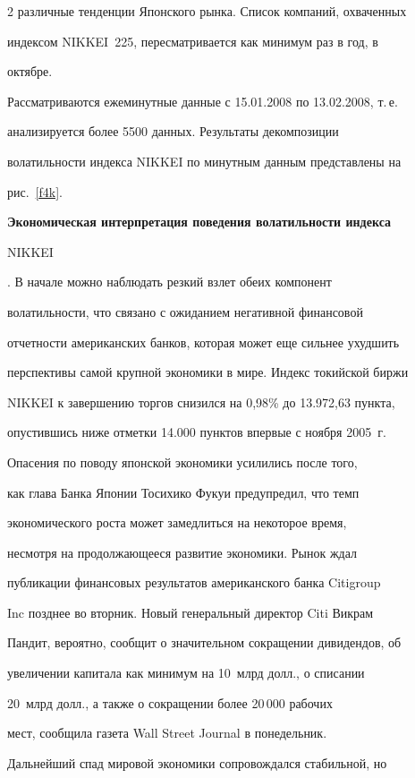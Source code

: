\begin{multicols}{2}
различные тенденции Японского рынка. Список компаний, охваченных


индексом NIKKEI~225, пересматривается как минимум раз в год, в


октябре.





Рассматриваются ежеминутные данные с 15.01.2008 по 13.02.2008, т.\,е.\


анализируется более 5500 данных. Результаты декомпозиции


волатильности индекса NIKKEI по минутным данным представлены на


рис.~\ref{f4k}.





{\bf Экономическая интерпретация поведения волатильности индекса


NIKKEI}. В начале можно наблюдать резкий взлет обеих компонент


волатильности, что связано с ожиданием негативной финансовой


отчетности американских банков, которая может еще сильнее ухудшить


перспективы самой крупной экономики в мире. Индекс токийской биржи


NIKKEI к завершению торгов снизился на 0,98\% до 13.972,63 пункта,


опустившись ниже отметки 14.000 пунктов впервые с ноября 2005~г.


Опасения по поводу японской экономики усилились после того,


как глава Банка Японии Тосихико Фукуи предупредил, что темп


экономического роста может замедлиться на некоторое время,


несмотря на продолжающееся развитие экономики. Рынок ждал


публикации финансовых результатов американского банка Citigroup


Inc позднее во вторник. Новый генеральный директор Citi Викрам


Пандит, вероятно, сообщит о значительном сокращении дивидендов, об


увеличении капитала как минимум на 10~млрд долл., о списании


20~млрд долл., а также о сокращении более 20\,000 рабочих


мест, сообщила газета Wall Street Journal в понедельник.


Дальнейший спад мировой экономики со\-про\-вож\-дал\-ся стабильной, но



\end{multicols}
